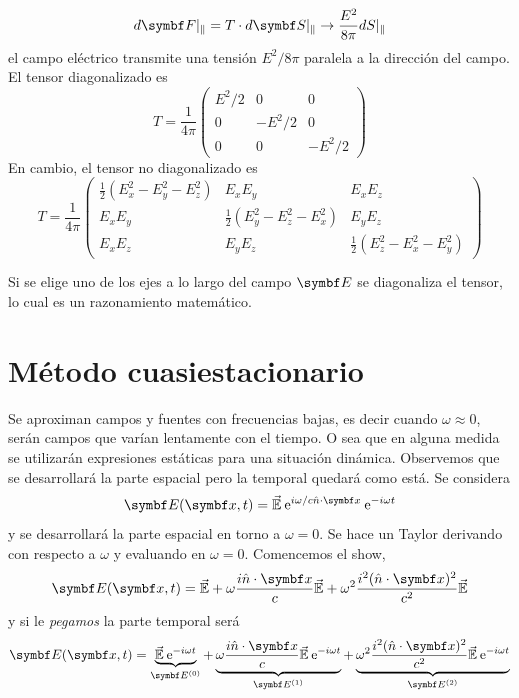 \documentclass[10pt,oneside]{CBFT_book}
\begin{document}
\[
	d\vb{F}|_{\parallel} = T\cdot d\vb{S}|_{\parallel} \rightarrow \frac{E^2}{8\pi} dS|_{\parallel}
\]
el campo eléctrico transmite una tensión $E^2/8\pi$ paralela a la dirección del campo.
El tensor diagonalizado es 
\[
	T = \frac{1}{4\pi}\begin{pmatrix}
	        E^2/2	& 0 	& 0 \\
		0	& -E^2/2	& 0 \\
		0	& 0	& -E^2/2
	       \end{pmatrix}
\]
En cambio, el tensor no diagonalizado es
\[
	T = \frac{1}{4\pi}\begin{pmatrix}
	        \frac{1}{2}( E_x^2 - E_y^2 -E_z^2 ) & E_x E_y	& E_x E_z \\
		E_x E_y	& \frac{1}{2}( E_y^2 - E_z^2 -E_x^2 ) & E_y E_z \\
		E_x E_z & E_y E_z & \frac{1}{2}( E_z^2 - E_x^2 -E_y^2 )
	       \end{pmatrix}
\]

Si se elige uno de los ejes a lo largo del campo $\vb{E}$ se diagonaliza el tensor, lo cual es
un razonamiento matemático.

\section{Método cuasiestacionario}

Se aproximan campos y fuentes con frecuencias bajas, es decir cuando $\omega \approx 0$, serán
campos que varían lentamente con el tiempo.
O sea que en alguna medida se utilizarán expresiones estáticas para una situación dinámica.
Observemos que se desarrollará la parte espacial pero la temporal quedará como está.
Se considera
\[
	\vb{E}(\vb{x},t) = \vec{\mathbb{E}} \euler^{i\omega/c \hat{n}\cdot\vb{x}} \euler^{-i\omega t}
\]
y se desarrollará la parte espacial en torno a $\omega=0$. Se hace un Taylor derivando con respecto
a $\omega$ y evaluando en $\omega=0$.
Comencemos el show,
\[
	\vb{E}(\vb{x},t) = \vec{\mathbb{E}} + \omega\frac{i\hat{n}\cdot\vb{x}}{c} \vec{\mathbb{E}} +
			\omega^2 \frac{i^2(\hat{n}\cdot\vb{x})^2}{c^2} \vec{\mathbb{E}}
\]
y si le {\it pegamos} la parte temporal será
\[
	\vb{E}(\vb{x},t) = \underbrace{ \vec{\mathbb{E}} \euler^{-i\omega t} }_{\vb{E}^{(0)}} + 
	\underbrace{\omega\frac{i\hat{n}\cdot\vb{x}}{c} \vec{\mathbb{E}}\euler^{-i\omega t}}_{\vb{E}^{(1)}} +
	\underbrace{\omega^2\frac{i^2(\hat{n}\cdot\vb{x})^2}{c^2}\vec{\mathbb{E}}\euler^{-i\omega t}}_{\vb{E}^{(2)}}
\]
\end{document}
